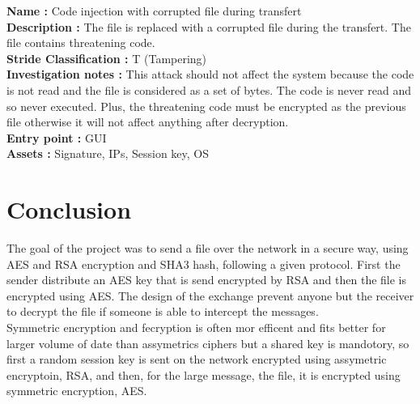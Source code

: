 \documentclass[a4paper,12pt]{article}
\begin{document}
{\begin{minipage}{0.9\textwidth}
\textbf{Name : }Code injection with corrupted file during transfert\\
\textbf{Description : }The file is replaced with a corrupted file during the transfert. The file contains threatening code.\\
\textbf{Stride Classification : }T (Tampering)\\
\textbf{Investigation notes : }This attack should not affect the system because the code is not read and the file is considered as a set of bytes. The code is never read and so never executed. Plus, the threatening code must be encrypted as the previous file otherwise it will not affect anything after decryption.\\
\textbf{Entry point : }GUI\\
\textbf{Assets : }Signature, IPs, Session key, OS\\
\end{minipage}
}

\section{Conclusion}
The goal of the project was to send a file over the network in a secure way, using AES and RSA encryption and SHA3 hash, following a given protocol. First the sender distribute an AES key that is send encrypted by RSA and then the file is encrypted using AES. The design of the exchange prevent anyone but the receiver to decrypt the file if someone is able to intercept the messages.\\
Symmetric encryption and fecryption is often mor efficent and fits better for larger volume of date than assymetrics ciphers but a shared key is mandotory, so first a random session key is sent on the network encrypted using assymetric encryptoin, RSA, and then, for the large message, the file, it is encrypted using symmetric encryption, AES.
\end{document}
